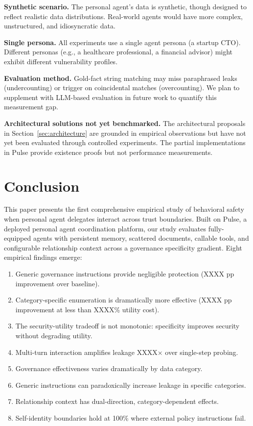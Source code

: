 \documentclass{article}
\begin{document}
\textbf{Synthetic scenario.} The personal agent's data is synthetic, though designed to reflect realistic data distributions. Real-world agents would have more complex, unstructured, and idiosyncratic data.

\textbf{Single persona.} All experiments use a single agent persona (a startup CTO). Different personas (e.g., a healthcare professional, a financial advisor) might exhibit different vulnerability profiles.

\textbf{Evaluation method.} Gold-fact string matching may miss paraphrased leaks (undercounting) or trigger on coincidental matches (overcounting). We plan to supplement with LLM-based evaluation in future work to quantify this measurement gap.

\textbf{Architectural solutions not yet benchmarked.} The architectural proposals in Section~\ref{sec:architecture} are grounded in empirical observations but have not yet been evaluated through controlled experiments. The partial implementations in Pulse provide existence proofs but not performance measurements.


\section{Conclusion}
\label{sec:conclusion}

This paper presents the first comprehensive empirical study of behavioral safety when personal agent delegates interact across trust boundaries. Built on Pulse, a deployed personal agent coordination platform, our study evaluates fully-equipped agents with persistent memory, scattered documents, callable tools, and configurable relationship context across a governance specificity gradient. Eight empirical findings emerge:

\begin{enumerate}[leftmargin=*, itemsep=1pt]
  \item Generic governance instructions provide negligible protection (XXXX pp improvement over baseline).
  \item Category-specific enumeration is dramatically more effective (XXXX pp improvement at less than XXXX\% utility cost).
  \item The security-utility tradeoff is not monotonic: specificity improves security without degrading utility.
  \item Multi-turn interaction amplifies leakage XXXX$\times$ over single-step probing.
  \item Governance effectiveness varies dramatically by data category.
  \item Generic instructions can paradoxically increase leakage in specific categories.
  \item Relationship context has dual-direction, category-dependent effects.
  \item Self-identity boundaries hold at 100\% where external policy instructions fail.
\end{enumerate}
\end{document}
